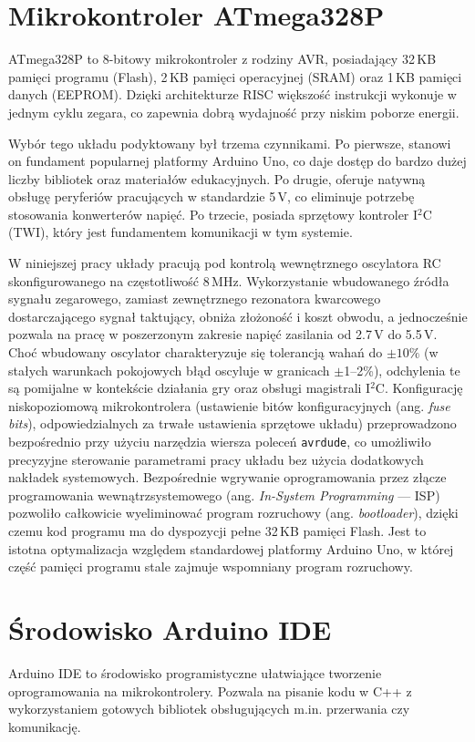 \documentclass{SGGW-thesis}
\begin{document}
\section{Mikrokontroler ATmega328P}
ATmega328P \cite{atmega328p_datasheet} to 8-bitowy mikrokontroler z rodziny AVR, posiadający 32\,KB pamięci programu (Flash), 2\,KB pamięci operacyjnej (SRAM) oraz 1\,KB pamięci danych (EEPROM). Dzięki architekturze RISC większość instrukcji wykonuje w jednym cyklu zegara, co zapewnia dobrą wydajność przy niskim poborze energii.

Wybór tego układu podyktowany był trzema czynnikami. Po pierwsze, stanowi on fundament popularnej platformy Arduino Uno, co daje dostęp do bardzo dużej liczby bibliotek oraz materiałów edukacyjnych. Po drugie, oferuje natywną obsługę peryferiów pracujących w standardzie 5\,V, co eliminuje potrzebę stosowania konwerterów napięć. Po trzecie, posiada sprzętowy kontroler I$^2$C (TWI), który jest fundamentem komunikacji w tym systemie.

W niniejszej pracy układy pracują pod kontrolą wewnętrznego oscylatora RC skonfigurowanego na częstotliwość 8\,MHz. Wykorzystanie wbudowanego źródła sygnału zegarowego, zamiast zewnętrznego rezonatora kwarcowego dostarczającego sygnał taktujący, obniża złożoność i koszt obwodu, a jednocześnie pozwala na pracę w poszerzonym zakresie napięć zasilania od 2.7\,V do 5.5\,V. Choć wbudowany oscylator charakteryzuje się tolerancją wahań do $\pm10\%$ (w stałych warunkach pokojowych błąd oscyluje w granicach $\pm$1--2\%), odchylenia te są pomijalne w kontekście działania gry oraz obsługi magistrali I$^2$C. Konfigurację niskopoziomową mikrokontrolera (ustawienie bitów konfiguracyjnych (ang. \textit{fuse bits}), odpowiedzialnych za trwałe ustawienia sprzętowe układu) przeprowadzono bezpośrednio przy użyciu narzędzia wiersza poleceń \texttt{avrdude}, co umożliwiło precyzyjne sterowanie parametrami pracy układu bez użycia dodatkowych nakładek systemowych. Bezpośrednie wgrywanie oprogramowania przez złącze programowania wewnątrzsystemowego (ang. \textit{In-System Programming} --- ISP) pozwoliło całkowicie wyeliminować program rozruchowy (ang. \textit{bootloader}), dzięki czemu kod programu ma do dyspozycji pełne 32\,KB pamięci Flash. Jest to istotna optymalizacja względem standardowej platformy Arduino Uno, w której część pamięci programu stale zajmuje wspomniany program rozruchowy.

\section{Środowisko Arduino IDE}
Arduino IDE \cite{cpp_arduino_ref} to środowisko programistyczne ułatwiające tworzenie oprogramowania na mikrokontrolery. Pozwala na pisanie kodu w C++ z wykorzystaniem gotowych bibliotek obsługujących m.in. przerwania czy komunikację.
\end{document}
